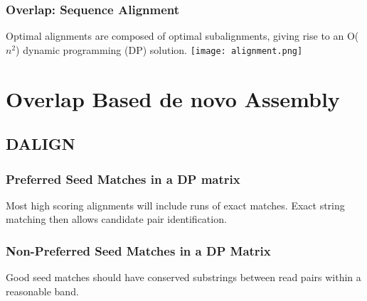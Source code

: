 \documentclass{beamer}
\begin{document}
\begin{frame}
\frametitle{Overlap: Sequence Alignment}
Optimal alignments are composed of optimal subalignments, giving rise to an O($n^2$) dynamic programming (DP) solution.
\texttt{[image: alignment.png]}


\end{frame}




\section{Overlap Based de novo Assembly}

\subsection{DALIGN}
\begin{frame}
\frametitle{Preferred Seed Matches in a DP matrix}
Most high scoring alignments will include runs of exact matches. Exact string matching then allows candidate pair identification.


% 
\end{frame}

\begin{frame}
\frametitle{Non-Preferred Seed Matches in a DP Matrix}
Good seed matches should have conserved substrings between read pairs within a reasonable band.




% 
\end{frame}
\end{document}

